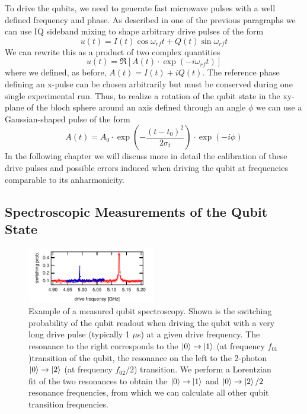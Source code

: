 To drive the qubits, we need to generate fast microwave pulses with a well defined frequency and phase. As described in one of the previous paragraphs we can use IQ sideband mixing to shape arbitrary drive pulses of the form
%
\begin{equation}
u(t) = I(t)\cos{\omega_{rf}t}+Q(t)\sin{\omega_{rf}t}
\end{equation}
%
We can rewrite this as a product of two complex quantities
%
\begin{equation}
u(t) = \Re\left[ A(t)\cdot\exp{\left(-i\omega_{rf} t\right)}\right]
\end{equation}
%
where we defined, as before, $A(t)=I(t)+iQ(t)$. The reference phase defining an x-pulse can be chosen arbitrarily but must be conserved during one single experimental run. Thus, to realize a rotation of the qubit state in the xy-plane of the bloch sphere around an axis defined through an angle $\phi$ we can use a Gaussian-shaped pulse of the form
%
\begin{equation}
A(t) = A_0\cdot\exp{\left(-\frac{(t-t_0)^2}{2\sigma_t}\right)}\cdot\exp{\left(-i\phi\right)}
\end{equation}
%
In the following chapter we will discuss more in detail the calibration of these drive pulses and possible errors induced when driving the qubit at frequencies comparable to its anharmonicity. 

\subsection{Spectroscopic Measurements of the Qubit State}

\begin{figure}[ht!]
\centering
\includegraphics[width=0.5\textwidth]{"./data/ct5/2011_04_21 - grover and tomo/example - qubit 2 spectroscopy"}
\caption[]{Example of a measured qubit spectroscopy. Shown is the switching probability of the qubit readout when driving the qubit with a very long drive pulse (typically 1 $\mu$s) at a given drive frequency. The resonance to the right corresponds to the $\left| 0 \right>\to\left| 1 \right>$ (at frequency $f_{01}$)transition of the qubit, the resonance on the left to the 2-photon $\left| 0 \right>\to\left| 2 \right>$ (at frequency $f_{02}/2$) transition. We perform a Lorentzian fit of the two resonances to obtain the $\left| 0 \right>\to\left| 1 \right>$ and $\left| 0 \right>\to\left| 2 \right>/2$ resonance frequencies, from which we can calculate all other qubit transition frequencies.}
\label{fig:qubit_spectroscopy_example}
\end{figure}


